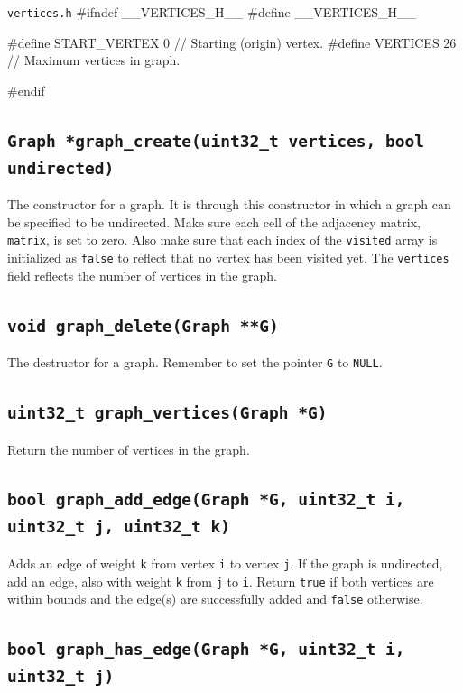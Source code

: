 \documentclass[11pt]{article}
\begin{document}
\begin{codelisting}{\texttt{vertices.h}}
#ifndef __VERTICES_H__
#define __VERTICES_H__

#define START_VERTEX 0   // Starting (origin) vertex.
#define VERTICES     26  // Maximum vertices in graph.

#endif
\end{codelisting}

\subsection{\texttt{Graph *graph\_create(uint32\_t vertices, bool undirected)}}

The constructor for a graph. It is through this constructor in which a
graph can be specified to be undirected. Make sure each cell of the
adjacency matrix, \texttt{matrix}, is set to zero. Also make sure that
each index of the \texttt{visited} array is initialized as
\texttt{false} to reflect that no vertex has been visited yet. The
\texttt{vertices} field reflects the number of vertices in the graph.

\subsection{\texttt{void graph\_delete(Graph **G)}}

The destructor for a graph. Remember to set the pointer \texttt{G} to
\texttt{NULL}.

\subsection{\texttt{uint32\_t graph\_vertices(Graph *G)}}

Return the number of vertices in the graph.

\subsection{\texttt{bool graph\_add\_edge(Graph *G, uint32\_t i,
uint32\_t j, uint32\_t k)}}

Adds an edge of weight \texttt{k} from vertex \texttt{i} to vertex
\texttt{j}. If the graph is undirected, add an edge, also with weight
\texttt{k} from \texttt{j} to \texttt{i}. Return \texttt{true} if both
vertices are within bounds and the edge(s) are successfully added and
\texttt{false} otherwise.

\subsection{\texttt{bool graph\_has\_edge(Graph *G, uint32\_t i,
uint32\_t j)}}
\end{document}
